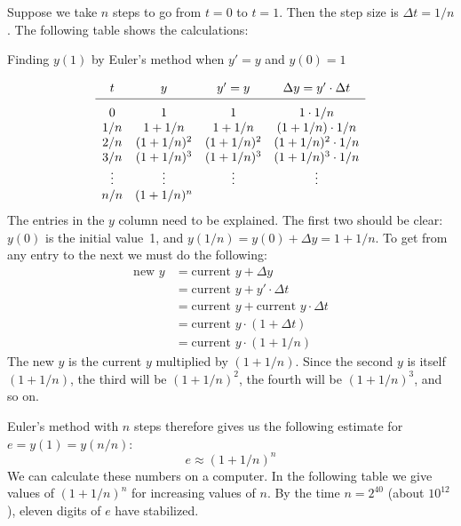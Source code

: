 	Suppose we take $n$ steps to go from $t = 0$ to $t = 1$.  Then the step size is $\Delta t = 1/n$.  The following table shows the calculations:
	\begin{center}
	Finding $y(1)$ by Euler's method when $y' = y$ and $y(0) = 1$
	\end{center}
	\addtolength{\arraycolsep}{6pt}
	\[
\begin{array}{cccc}
	t & y & y' = y & \Delta y = y' \cdot \Delta t 
		\\[2pt] \hline
	\rule{0pt}{14pt} 0 \rule{0pt}{14pt} & 1 & 1 & 
		1 \cdot 1/n \\
	1/n & 1 + 1/n & 1 + 1/n & (1 + 1/n) \cdot 1/n \\
	2/n & (1 + 1/n)^2 & (1 + 1/n)^2 & 
		(1 + 1/n)^2 \cdot 1/n \\
	3/n & (1 + 1/n)^3 & (1 + 1/n)^3 & 
		(1 + 1/n)^3 \cdot 1/n \\
	\vdots & \vdots & \vdots & \vdots \\
	n/n & (1 + 1/n)^n 
	\end{array}
\]
	\addtolength{\arraycolsep}{-6pt}%
The entries in the $y$ column need to be explained.  The first two should be clear: $y(0)$ is the initial value~1, and $y(1/n) = y(0) + \Delta y = 1 + 1/n$.  To get from any entry to the next we must do the following:
	\begin{align*}
	\mbox{new $y$} &= \mbox{current $y$} + \Delta y \\
		&= \mbox{current $y$} + y' \cdot \Delta t \\
		&= \mbox{current $y$} + 
			\mbox{current $y$} \cdot \Delta t \\
		&= \mbox{current $y$} \cdot (1 + \Delta t) \\
		&= \mbox{current $y$} \cdot (1 + 1/n)
	\end{align*}
The new $y$ is the current $y$ multiplied by $(1 + 1/n)$.  Since the second $y$ is itself $(1 + 1/n)$, the third will be $(1 + 1/n)^2$, the fourth will be $(1 + 1/n)^3$, and so on.

	Euler's method with $n$ steps therefore gives us the following estimate for $e = y(1) = y(n/n)$:
	\[
e \approx (1 + 1/n)^n
\]
We can calculate these numbers on a computer.  In the following table we give values of $(1+1/n)^n$ for increasing values of $n$.  By the time $n=2^{40}$ (about $10^{12}$), eleven digits of $e$ have stabilized.

